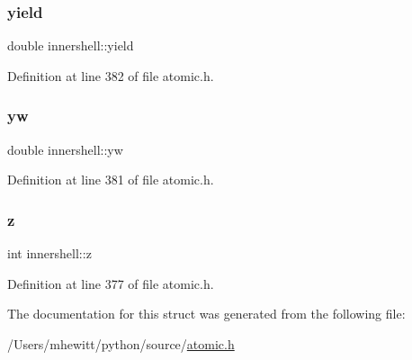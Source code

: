 \mbox{\label{structinnershell_a1c9a25bdebb548e8296186d395d46189}} 
\subsubsection{\texorpdfstring{yield}{yield}}
{\footnotesize\ttfamily double innershell\+::yield}



Definition at line 382 of file atomic.\+h.

\mbox{\label{structinnershell_a7e0080ec032ea977538a4b0c0d0ec86f}} 
\subsubsection{\texorpdfstring{yw}{yw}}
{\footnotesize\ttfamily double innershell\+::yw}



Definition at line 381 of file atomic.\+h.

\mbox{\label{structinnershell_ab683790cd59d9da8c2c8e2d1dcb2a970}} 
\subsubsection{\texorpdfstring{z}{z}}
{\footnotesize\ttfamily int innershell\+::z}



Definition at line 377 of file atomic.\+h.



The documentation for this struct was generated from the following file\+:\begin{DoxyCompactItemize}
\item 
/\+Users/mhewitt/python/source/\hyperlink{atomic_8h}{atomic.\+h}\end{DoxyCompactItemize}
